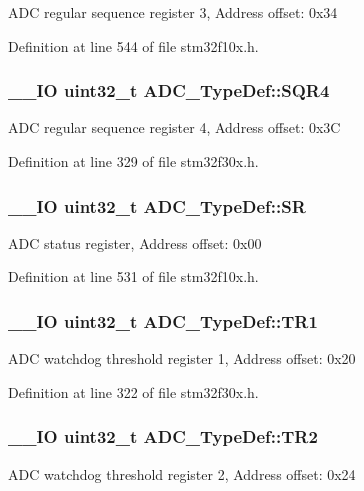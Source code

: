 A\-D\-C regular sequence register 3, Address offset\-: 0x34 

Definition at line 544 of file stm32f10x.\-h.

\hypertarget{struct_a_d_c___type_def_ab66c9816c1ca151a6ec728ec55655264}{
\subsubsection[{S\-Q\-R4}]{\setlength{\rightskip}{0pt plus 5cm}\-\_\-\-\_\-\-I\-O {\bf uint32\-\_\-t} A\-D\-C\-\_\-\-Type\-Def\-::\-S\-Q\-R4}}\label{struct_a_d_c___type_def_ab66c9816c1ca151a6ec728ec55655264}
A\-D\-C regular sequence register 4, Address offset\-: 0x3\-C 

Definition at line 329 of file stm32f30x.\-h.

\hypertarget{struct_a_d_c___type_def_a9745df96e98f3cdc2d05ccefce681f64}{
\subsubsection[{S\-R}]{\setlength{\rightskip}{0pt plus 5cm}\-\_\-\-\_\-\-I\-O {\bf uint32\-\_\-t} A\-D\-C\-\_\-\-Type\-Def\-::\-S\-R}}\label{struct_a_d_c___type_def_a9745df96e98f3cdc2d05ccefce681f64}
A\-D\-C status register, Address offset\-: 0x00 

Definition at line 531 of file stm32f10x.\-h.

\hypertarget{struct_a_d_c___type_def_a052b985734ae89cc566b5eebcbccb790}{
\subsubsection[{T\-R1}]{\setlength{\rightskip}{0pt plus 5cm}\-\_\-\-\_\-\-I\-O {\bf uint32\-\_\-t} A\-D\-C\-\_\-\-Type\-Def\-::\-T\-R1}}\label{struct_a_d_c___type_def_a052b985734ae89cc566b5eebcbccb790}
A\-D\-C watchdog threshold register 1, Address offset\-: 0x20 

Definition at line 322 of file stm32f30x.\-h.

\hypertarget{struct_a_d_c___type_def_af12d65ad51bd7bd8218b247a89e3c1b8}{
\subsubsection[{T\-R2}]{\setlength{\rightskip}{0pt plus 5cm}\-\_\-\-\_\-\-I\-O {\bf uint32\-\_\-t} A\-D\-C\-\_\-\-Type\-Def\-::\-T\-R2}}\label{struct_a_d_c___type_def_af12d65ad51bd7bd8218b247a89e3c1b8}
A\-D\-C watchdog threshold register 2, Address offset\-: 0x24 

